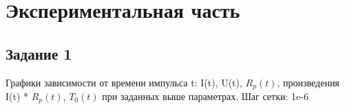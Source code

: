 \documentclass[a4paper,oneside,12pt]{extreport}
\begin{document}
\newpage 

\section{Экспериментальная часть}

\subsection{Задание 1}

Графики зависимости от времени импульса t: I(t), U(t), $R_p(t)$, 
произведения I(t) * $R_p(t)$, $T_0(t)$ при заданных выше параметрах.
Шаг сетки: 1e-6

\begin{figure}[ht!]
\end{figure}

\begin{figure}[ht!]
\end{figure}
\end{document}
